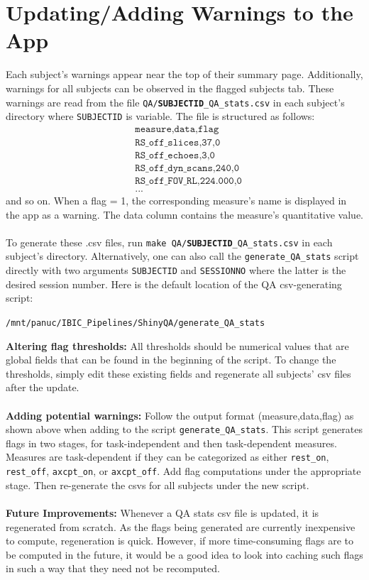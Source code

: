 \documentclass{article}
\begin{document}
\section{Updating/Adding Warnings to the App}
Each subject's warnings appear near the top of their summary page. Additionally, warnings for all subjects can be observed in the flagged subjects tab. These warnings are read from the file \texttt{QA/\textbf{SUBJECTID}\_QA\_stats.csv} in each subject's directory where \texttt{SUBJECTID} is variable. The file is structured as follows:
\begin{align*}
	& \texttt{measure,data,flag}\\
	& \texttt{RS\_off\_slices,37,0}\\
	& \texttt{RS\_off\_echoes,3,0}\\
	& \texttt{RS\_off\_dyn\_scans,240,0}\\
	& \texttt{RS\_off\_FOV\_RL,224.000,0}\\
	& ...
\end{align*}
and so on. When a flag = 1, the corresponding measure's name is displayed in the app as a warning. The data column contains the measure's quantitative value. \\\\
To generate these .csv files, run \texttt{make QA/\textbf{SUBJECTID}\_QA\_stats.csv} in each subject's directory. Alternatively, one can also call the \texttt{generate\_QA\_stats} script directly with two arguments \texttt{SUBJECTID} and \texttt{SESSIONNO} where the latter is the desired session number. Here is the default location of the QA csv-generating script:
\begin{center}
	\texttt{/mnt/panuc/IBIC\_Pipelines/ShinyQA/generate\_QA\_stats}
\end{center}
\textbf{Altering flag thresholds:} All thresholds should be numerical values that are global fields that can be found in the beginning of the script. To change the thresholds, simply edit these existing fields and regenerate all subjects' csv files after the update. \\\\
\textbf{Adding potential warnings:} Follow the output format (measure,data,flag) as shown above when adding to the script \texttt{generate\_QA\_stats}. This script generates flags in two stages, for task-independent and then task-dependent measures. Measures are task-dependent if they can be categorized as either \texttt{rest\_on}, \texttt{rest\_off}, \texttt{axcpt\_on}, or \texttt{axcpt\_off}. Add flag computations under the appropriate stage. Then re-generate the csvs for all subjects under the new script. \\\\
\textbf{Future Improvements:} Whenever a QA stats csv file is updated, it is regenerated from scratch. As the flags being generated are currently inexpensive to compute, regeneration is quick. However, if more time-consuming flags are to be computed in the future, it would be a good idea to look into caching such flags in such a way that they need not be recomputed. 
\end{document}
